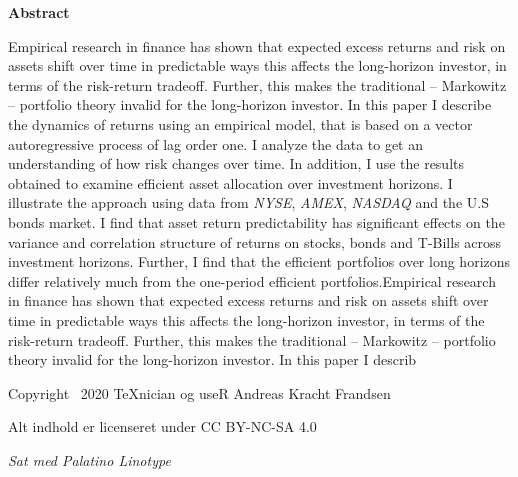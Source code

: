 \begin{titlingpage}
\begin{center}
\textbf{Abstract}
\end{center}
\begin{center}
\begin{minipage}{12cm}
    Empirical research in finance has shown that expected excess returns and risk on assets shift over time in predictable ways this affects the long-horizon investor, in terms of the risk-return tradeoff. Further, this makes the traditional -- Markowitz -- portfolio theory invalid for the long-horizon investor. In this paper I describe the dynamics of returns using an empirical model, that is based on a vector autoregressive process of lag order one. I analyze the data to get an understanding of how risk changes over time. In addition, I use the results obtained to examine efficient asset allocation over investment horizons. I illustrate the approach using data from \textit{NYSE}, \textit{AMEX}, \textit{NASDAQ} and the U.S bonds market. I find that asset return predictability has significant effects on the variance and correlation structure of returns on stocks, bonds and T-Bills across investment horizons. Further, I find that the efficient portfolios over long horizons differ relatively much from the one-period efficient portfolios.Empirical research in finance has shown that expected excess returns and risk on assets shift over time in predictable ways this affects the long-horizon investor, in terms of the risk-return tradeoff. Further, this makes the traditional -- Markowitz -- portfolio theory invalid for the long-horizon investor. In this paper I describ
\end{minipage}
\end{center}
\end{titlingpage}

\newpage

\vspace*{\fill}

Copyright \textcopyright\, 2020 \TeX nician og useR Andreas Kracht Frandsen

Alt indhold er licenseret under CC BY-NC-SA 4.0

\textit{Sat med Palatino Linotype}

\newpage